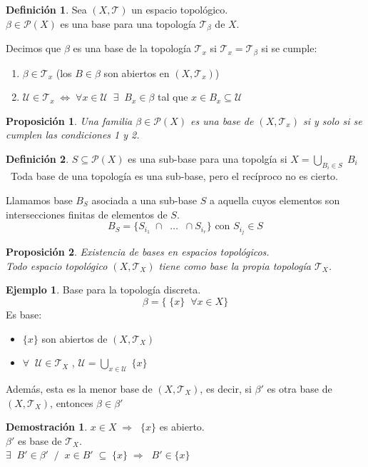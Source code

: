 \documentclass[12pt,twoside]{report}
\newcommand\mc[1]{\mathcal{#1}}
\theoremstyle{azul}
\theoremstyle{azul2}
\theoremstyle{plain}
\newtheorem*{prop}{Proposición}
\theoremstyle{definition}
\newtheorem*{eje}{Ejemplo}
\newtheorem*{defi}{Definición}
\newtheorem*{dem}{Demostración}
\theoremstyle{remark}
\begin{document}
\begin{defi}
Sea $(X,\mc{T})$ un espacio topológico.\\
$\beta \in \mathcal{P}(X)$ es una base para una topología $\mc{T}_{\beta}$ de $X$.

Decimos que $\beta$ es una base de la topología $\mc{T}_x$ si  $\mc{T}_x = \mc{T}_{\beta}$ si se cumple:
\begin{enumerate}
    \item $\beta \in \mc{T}_x$ (los $B\in \beta$ son abiertos en $(X, \mc{T}_x)$)
    \item $\mathcal{U} \in \mc{T}_x \; \Longleftrightarrow \;\forall x \in \mathcal{U} \;\; \exists \;\; B_x \in \beta$ tal que $x \in B_x \subseteq \mathcal{U}$
\end{enumerate}
\end{defi}
\newpage
\begin{prop}
Una familia $\beta \in \mathcal{P}(X)$ es una base de $(X, \mc{T}_x)$ si y solo si se cumplen las condiciones 1 y 2. 
\end{prop}

\begin{defi}
$S \subseteq \mathcal{P}(X)$ es una sub-base para una topolgía si $X = \underset{B_i \in S}{\bigcup}\; B_i$\
Toda base de una topología es una sub-base, pero el recíproco no es cierto.

Llamamos base $B_S$ asociada a una sub-base $S$ a aquella cuyos elementos son intersecciones finitas de elementos de $S$.
$$B_S = \{ S_{i_1} \; \cap \;\;\dots \;\; \cap S_{i_r} \}\text{    con }S_{i_j} \in S$$
\end{defi}

\begin{prop}
Existencia de bases en espacios topológicos.\\ \vspace{3mm}
Todo espacio topológico $(X,\mc{T}_X)$ tiene como base la propia topología $\mc{T}_X$.
\end{prop}

\begin{eje}
     Base para la topología discreta. $$\beta = \{ \; \{x\} \;\; \forall x \in X\}$$ 
    Es base: \vspace{-4mm} \begin{itemize}
        \item $\{x\}$ son abiertos de $(X,\mc{T}_X)$
        \item $\forall \;\; \mathcal{U} \in \mc{T}_X$   ,  $\mathcal{U} = \underset{x \in \mathcal{U}}{\bigcup}\;  \{x\}$
    \end{itemize}
    Además, esta es la menor base de $(X,\mc{T}_X)$, es decir, si $\beta'$ es otra base de $(X,\mc{T}_X)$, entonces $\beta \in \beta'$
    \begin{dem}
    $x \in X \; \Rightarrow \;\; \{x\}$ es abierto.\\
    $\beta'$ es base de $\mc{T}_X$.\\
    $\exists \;\; B' \in \beta' \;\; / \;\; x \in B' \; \subseteq \; \{x\}  \; \Rightarrow \;\; B' \in \{x\}$
    \end{dem}
\end{eje}
\end{document}
